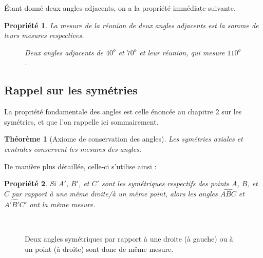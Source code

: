 \documentclass[12 pt]{article}
\theoremstyle{plain}
\newcounter{n}
\numberwithin{n}{section}
\newtheorem{theo}{Théorème}
\newtheorem*{prop}{Propriété}
\begin{document}
Étant donné deux angles adjacents, on a la propriété immédiate suivante. 
\begin{prop}
La mesure de la réunion de deux angles adjacents est la somme de leurs mesures respectives. 

\begin{figure}[H]\center
{}\caption{Deux angles adjacents de $40^o$ et $70^o$ et leur réunion, qui mesure $110^o$.}
\end{figure}
\end{prop}

\subsection{Rappel sur les symétries}
La propriété fondamentale des angles est celle énoncée au chapitre 2 sur les symétries, et que l'on rappelle ici sommairement. 

\begin{theo}[Axiome de conservation des angles]
Les symétries axiales et centrales conservent les mesures des angles. 
\end{theo}

De manière plus détaillée, celle-ci s'utilise ainsi : 

\begin{prop}
Si $A'$, $B'$, et $C'$ sont les symétriques respectifs des points $A$, $B$, et $C$ par rapport à 
une même droite/à un même point, alors les angles $\widehat{ABC}$ et $\widehat{A'B'C'}$ ont la même mesure. 
\end{prop}

\begin{figure}[H]\center
{}  \ \ \ \ \ \ \ \ \ \ \
\caption{Deux angles symétriques par rapport à une droite (à gauche) ou à un point (à droite) sont donc de même mesure.}
\end{figure}
\end{document}
